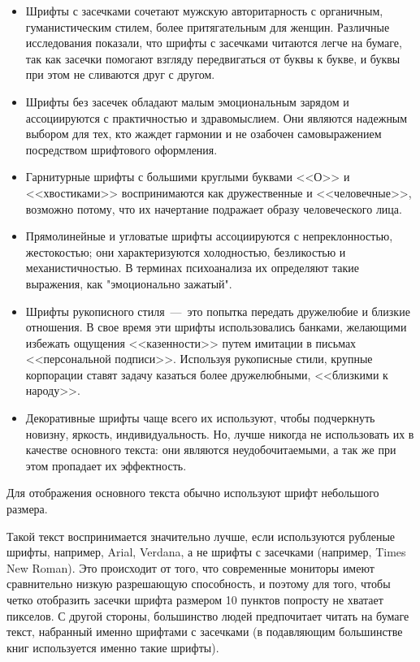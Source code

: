 \documentclass[14pt]{extarticle}
\begin{document}
\begin{itemize}
	\item Шрифты с засечками сочетают мужскую авторитарность с органичным, гуманистическим стилем, более притягательным для женщин. Различные исследования показали, что шрифты с засечками читаются легче на бумаге, так как засечки помогают взгляду передвигаться от буквы к букве, и буквы при этом не сливаются друг с другом.
	\item Шрифты без засечек обладают малым эмоциональным зарядом и ассоциируются с практичностью и здравомыслием. Они являются надежным выбором для тех, кто жаждет гармонии и не озабочен самовыражением посредством шрифтового оформления.
	\item Гарнитурные шрифты с большими круглыми буквами <<О>> и <<хвостиками>> воспринимаются как дружественные и <<человечные>>, возможно потому, что их начертание подражает образу человеческого лица.
	\item Прямолинейные и угловатые шрифты ассоциируются с непреклонностью, жестокостью; они характеризуются холодностью, безликостью и механистичностью. В терминах психоанализа их определяют такие выражения, как "эмоционально зажатый".
	\item Шрифты рукописного стиля~---~это попытка передать дружелюбие и близкие отношения. В свое время эти шрифты использовались банками, желающими избежать ощущения <<казенности>> путем имитации в письмах <<персональной подписи>>. Используя рукописные стили, крупные корпорации ставят задачу казаться более дружелюбными, <<близкими к народу>>.
	\item Декоративные шрифты чаще всего их используют, чтобы подчеркнуть новизну, яркость, индивидуальность. Но, лучше никогда не использовать их в качестве основного текста: они являются неудобочитаемыми, а так же при этом пропадает их эффектность.
\end{itemize}

Для отображения основного текста обычно используют шрифт небольшого размера.

Такой текст воспринимается значительно лучше, если используются рубленые шрифты, например, Arial, Verdana, а не шрифты с засечками (например, Times New Roman). Это происходит от того, что современные мониторы имеют сравнительно низкую разрешающую способность, и поэтому для того, чтобы четко отобразить засечки шрифта размером 10 пунктов попросту не хватает пикселов. С другой стороны, большинство людей предпочитает читать на бумаге текст, набранный именно шрифтами с засечками (в подавляющим большинстве книг используется именно такие шрифты).
\end{document}
